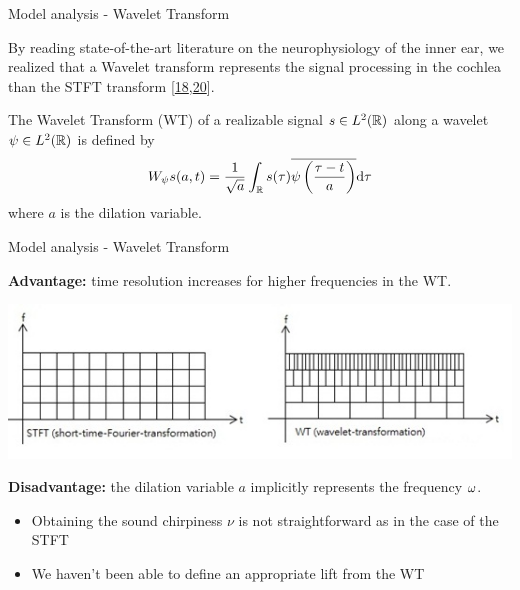 \documentclass[10pt,american,ignorenonframetext,aspectratio=1610]{beamer}
\providecommand{\tightlist}{%
  \setlength{\itemsep}{0pt}\setlength{\parskip}{0pt}}
\theoremstyle{remark}
\begin{document}
\begin{frame}{Model analysis - Wavelet Transform}
\protect\hypertarget{model-analysis---wavelet-transform}{}

By reading state-of-the-art literature on the neurophysiology of the
inner ear, we realized that a Wavelet transform represents the signal
processing in the cochlea than the STFT transform
{[}\protect\hyperlink{ref-reimann2011}{18},\protect\hyperlink{ref-yang1992}{20}{]}.

\begin{definition}
The Wavelet Transform (WT) of a realizable signal $s\in L^2(\mathbb{R})$ along
a wavelet $\psi\in L^2(\mathbb{R})$ is defined by
$$W_\psi s(a,t) = \frac{1}{\sqrt{a}} \int_{\mathbb{R}} s(\tau) \overline{\psi\left(\frac{\tau-t}{a}\right)} \mathrm{d}\tau$$
where $a$ is the dilation variable.
\end{definition}

\end{frame}

\begin{frame}{Model analysis - Wavelet Transform}
\protect\hypertarget{model-analysis---wavelet-transform-1}{}

\textbf{Advantage:} time resolution increases for higher frequencies in
the WT.

\includegraphics{img/stft_vs_wt.jpg}

\textbf{Disadvantage:} the dilation variable \(a\) implicitly represents
the frequency \(\omega\).

\begin{itemize}
\tightlist
\item
  Obtaining the sound chirpiness \(\nu\) is not straightforward as in
  the case of the STFT
\item
  We haven't been able to define an appropriate lift from the WT
\end{itemize}

\end{frame}
\end{document}
